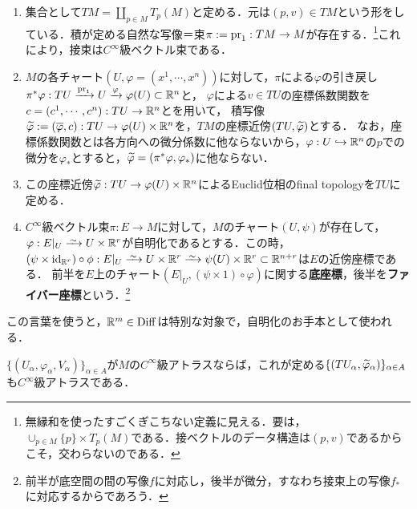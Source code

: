 \documentclass[uplatex,dvipdfmx]{jsreport}
\begin{document}
\begin{definition}\mbox{}
    \begin{enumerate}
        \item 集合として$TM=\coprod_{p\in M}T_p(M)$と定める．元は$(p,v)\in TM$という形をしている．積が定める自然な写像＝束$\pi:=\mathrm{pr}_1:TM\to M$が存在する．\footnote{無縁和を使ったすごくぎこちない定義に見える．要は，$\cup_{p\in M}\{p\}\times T_p(M)$である．接ベクトルのデータ構造は$(p,v)$であるからこそ，交わらないのである．}これにより，接束は$C^\infty$級ベクトル束である．
        \item $M$の各チャート$(U,\varphi=(x^1,\cdots,x^n))$に対して，$\pi$による$\varphi$の引き戻し$\pi^*\varphi:TU\xrightarrow{\mathrm{pr}_1}U\xrightarrow{\varphi}\varphi(U)\subset\mathbb{R}^n$と，
        $\varphi$による$v\in TU$の座標係数関数を$c=(c^1,\cdots,c^n):TU\to\mathbb{R}^n$とを用いて，
        積写像$\widetilde{\varphi}:=(\overline{\varphi},c):TU\to\varphi(U)\times\mathbb{R}^n$を，$TM$の座標近傍$(TU,\widetilde{\varphi})$とする．
        なお，座標係数関数とは各方向への微分係数に他ならないから，$\varphi:U\hookrightarrow\mathbb{R}^n$の$p$での微分を$\varphi_*$とすると，$\widetilde{\varphi}=(\pi^*\varphi,\varphi_*)$に他ならない．
        \item この座標近傍$\widetilde{\varphi}:TU\to\varphi(U)\times\mathbb{R}^n$によるEuclid位相のfinal topologyを$TU$に定める．
        \item $C^\infty$級ベクトル束$\pi:E\to M$に対して，$M$のチャート$(U,\psi)$が存在して，$\varphi:E|_U\iso U\times\R^r$が自明化であるとする．この時，$(\psi\times\id_{\R^r})\circ\phi:E|_U\iso U\times\R^r\iso\psi(U)\times\R^r\subset\R^{n+r}$は$E$の近傍座標である．
        前半を$E$上のチャート$(E|_U,(\psi\times 1)\circ\varphi)$に関する\textbf{底座標}，後半を\textbf{ファイバー座標}という．\footnote{前半が底空間の間の写像$f$に対応し，後半が微分，すなわち接束上の写像$f_*$に対応するからであろう．}
    \end{enumerate}
\end{definition}
\begin{remarks}
    この言葉を使うと，$\mathbb{R}^m\in\mathrm{Diff}$は特別な対象で，自明化のお手本として使われる．

\end{remarks}

\begin{lemma}
    $\{(U_\alpha,\varphi_\alpha,V_\alpha)\}_{\alpha\in A}$が$M$の$C^\infty$級アトラスならば，これが定める$\{(TU_\alpha,\widetilde{\varphi}_\alpha)\}_{\alpha\in A}$も$C^\infty$級アトラスである．
\end{lemma}
\end{document}
